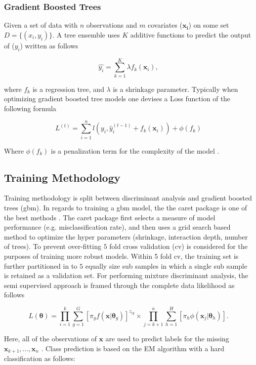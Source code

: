 \documentclass[11pt,letterpaper]{article}
\begin{document}
\subsubsection{Gradient Boosted Trees}
Given a set of data with $n$ observations and $m$ covariates ($\bm{x_i}$) on some set $D = \{ (x_i,y_i) \}$. A tree ensemble uses $K$ additive functions to predict the output of ($y_i$) written as follows 

$$ \hat{y_i}  = \sum_{k=1}^K \lambda f_k(\bm{x}_i), $$ 

where $f_k$ is a regression tree, and $\lambda$ is a shrinkage parameter. Typically when optimizing gradient boosted tree models one devises a Loss function of the following formula 

$$L^{(t)} = \sum_{i=1}^n l(y_i, \hat{y}^{(t-1)}_i + f_k(\bm{x}_i)) + \phi(f_k) $$

Where $\phi(f_k)$ is a penalization term for the complexity of the model \citep[see][for specific implementation]{gradientboost}.

\subsection{Training Methodology}
Training methodology is split between discriminant analysis and gradient boosted trees (gbm). In regards to training a gbm model, the the caret package is one of the best methods  \citep{caret}. The  caret package first selects a measure of model performance (e.g. misclassification rate), and then uses a grid search based method to optimize the hyper parameters (shrinkage, interaction depth, number of trees). To prevent over-fitting $5$ fold cross validation (cv) is considered for the purposes of training more robust models. Within 5 fold cv, the training set is further partitioned in to $5$ equally size sub samples in which a single sub sample is retained as a validation set.  
For performing mixture discriminant analysis, the semi supervised approach is framed through the complete data likelihood as follows 

$$L(\bm{\theta}) =   \prod_{i=1}^k \sum_{g=1}^G \left[  \pi_g f(\bm{x}| \bm{\theta}_g) \right]^{z_{ig}} \times \prod_{j=k+1}^n \sum_{h=1}^H \left[\pi_h\phi(\bm{x}_j| \bm{\theta}_h) \right].$$

Here, all of the observations of $\bm{x}$ are used to predict labels for the missing $\bm{x}_{k+1}, \hdots ,\bm{x}_n$ \citep{mixdist}. Class prediction is based on the EM algorithm with a hard classification as follows:
\end{document}
